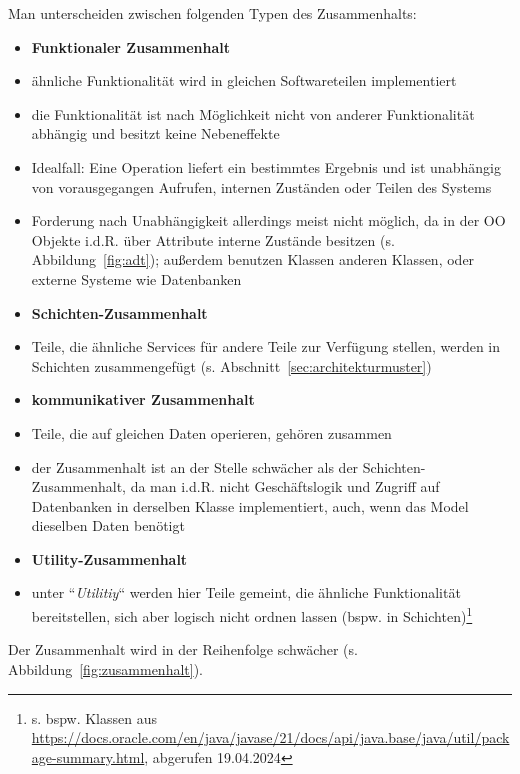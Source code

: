 Man unterscheiden zwischen folgenden Typen des Zusammenhalts:

\begin{itemize}
    \item \textbf{Funktionaler Zusammenhalt}
    \item[] ähnliche Funktionalität wird in gleichen Softwareteilen implementiert
    \item[] die Funktionalität ist nach Möglichkeit nicht von anderer Funktionalität abhängig und besitzt keine Nebeneffekte
    \item[] Idealfall: Eine Operation liefert ein bestimmtes Ergebnis und ist unabhängig von vorausgegangen Aufrufen, internen Zuständen oder Teilen des Systems
    \item[] Forderung nach Unabhängigkeit allerdings meist nicht möglich, da in der OO Objekte i.d.R. über Attribute interne Zustände besitzen (s. Abbildung~\ref{fig:adt}); außerdem benutzen Klassen anderen Klassen, oder externe Systeme wie Datenbanken
    \item \textbf{Schichten-Zusammenhalt}
    \item[] Teile, die ähnliche Services für andere Teile zur Verfügung stellen, werden in Schichten zusammengefügt (s. Abschnitt~\ref{sec:architekturmuster})
    \item \textbf{kommunikativer Zusammenhalt}
    \item[] Teile, die auf gleichen Daten operieren, gehören zusammen
    \item[] der Zusammenhalt ist an der Stelle schwächer als der Schichten-Zusammenhalt, da man i.d.R. nicht Geschäftslogik und Zugriff auf Datenbanken in derselben Klasse implementiert, auch, wenn das Model dieselben Daten benötigt
    \item \textbf{Utility-Zusammenhalt}
    \item[] unter ``\textit{Utilitiy}`` werden hier Teile gemeint, die ähnliche Funktionalität bereitstellen, sich aber logisch nicht ordnen lassen (bspw. in Schichten)\footnote{s. bspw. Klassen aus \url{https://docs.oracle.com/en/java/javase/21/docs/api/java.base/java/util/package-summary.html}, abgerufen 19.04.2024}
\end{itemize}

\noindent
Der Zusammenhalt wird in der Reihenfolge schwächer (s. Abbildung~\ref{fig:zusammenhalt}).

